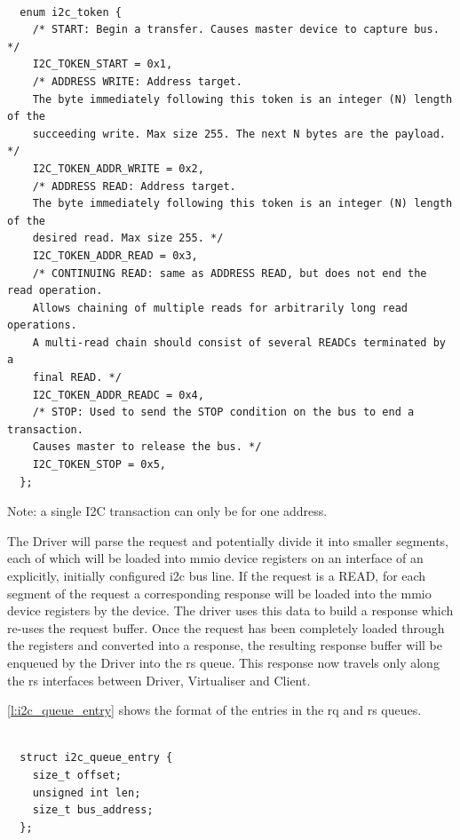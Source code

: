 \documentclass[a4paper,12pt]{report}
\begin{document}
\begin{lstlisting}[gobble=2,firstline=2,float=th,
  label={l:i2c_token_definition},
  caption={I2C token definitions.}]

  enum i2c_token {
    /* START: Begin a transfer. Causes master device to capture bus. */
    I2C_TOKEN_START = 0x1,
    /* ADDRESS WRITE: Address target.
    The byte immediately following this token is an integer (N) length of the
    succeeding write. Max size 255. The next N bytes are the payload. */
    I2C_TOKEN_ADDR_WRITE = 0x2,
    /* ADDRESS READ: Address target.
    The byte immediately following this token is an integer (N) length of the
    desired read. Max size 255. */
    I2C_TOKEN_ADDR_READ = 0x3,
    /* CONTINUING READ: same as ADDRESS READ, but does not end the read operation.
    Allows chaining of multiple reads for arbitrarily long read operations.
    A multi-read chain should consist of several READCs terminated by a
    final READ. */
    I2C_TOKEN_ADDR_READC = 0x4,
    /* STOP: Used to send the STOP condition on the bus to end a transaction.
    Causes master to release the bus. */
    I2C_TOKEN_STOP = 0x5,
  };
\end{lstlisting}

Note: a single I2C transaction can only be for one address.

The Driver will parse the request and potentially divide it into smaller segments,
each of which will be loaded into \gls{mmio} device registers
on an interface of an explicitly, initially configured \gls{i2c} bus line.
If the request is a READ, for each segment of the request a corresponding response
will be loaded into the \gls{mmio} device registers by the device.
The driver uses this data to build a response which re-uses the request buffer.
Once the request has been completely loaded through the registers and converted into a response,
the resulting response buffer will be enqueued by the Driver into the \gls{rs} queue.
This response now travels only along the \gls{rs} interfaces between Driver, Virtualiser and Client.

\autoref{l:i2c_queue_entry} shows the format of the entries in the \gls{rq}
and \gls{rs} queues.

\begin{lstlisting}[gobble=2,firstline=2,float=th,
  label={l:i2c_queue_entry},
  caption={I2C request and response queue entry data structure.}]

  struct i2c_queue_entry {
    size_t offset;
    unsigned int len;
    size_t bus_address;
  };
\end{lstlisting}
\end{document}
